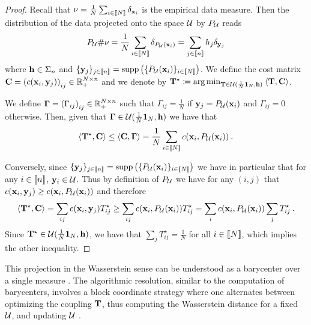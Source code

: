 \begin{proof}
Recall that $\nu = \frac{1}{N} \sum_{i \in {[\![N]\!]}} \delta_{{\mathbf{x}}_i}$ is the empirical data measure. Then the distribution of the data projected onto the space ${\mathcal{U}}$ by $P_{{\mathcal{U}}}$ reads
\begin{align}
    P_{{\mathcal{U}}} \# \nu = \frac{1}{N} \sum_{i \in {[\![N]\!]}} \delta_{P_{{\mathcal{U}}}({\mathbf{x}}_{i})} = \sum_{j \in {[\![n]\!]}} h_j \delta_{{\mathbf{y}}_{j}}
\end{align} 
where ${\mathbf{h}} \in \Sigma_n$ and $\{{\mathbf{y}}_j \}_{j \in {[\![n]\!]}} = \text{supp}\left( \{P_{{\mathcal{U}}}({\mathbf{x}}_{i}) \}_{i \in {[\![N]\!]}} \right)$. We define the cost matrix ${\mathbf{C}} = \left( c({\mathbf{x}}_i, {\mathbf{y}}_j) \right)_{ij} \in \mathbb{R}_+^{N \times n}$ and we denote by ${\mathbf{T}}^\star \coloneqq \operatorname*{arg\,min}_{{\mathbf{T}} \in {\mathcal{U}}(\frac{1}{N} \bm{1}_N, {\mathbf{h}})} \: \langle {\mathbf{T}}, {\mathbf{C}} \rangle$.

We define $\mathbf{\Gamma} = \left( \Gamma_{ij} \right)_{ij} \in \mathbb{R}_+^{N \times n}$ such that $\Gamma_{ij} = \frac{1}{N}$ if ${\mathbf{y}}_j = P_{{\mathcal{U}}}({\mathbf{x}}_i)$ and $\Gamma_{ij} = 0$ otherwise.
Then, given that $\mathbf{\Gamma} \in {\mathcal{U}}(\frac{1}{N} \bm{1}_N, {\mathbf{h}})$ we have that
\begin{align}
    \langle {\mathbf{T}}^\star, {\mathbf{C}} \rangle \leq \langle {\mathbf{C}}, \mathbf{\Gamma} \rangle = \frac{1}{N} \sum_{i \in {[\![N]\!]}} c(\mathbf{x}_i, P_{{\mathcal{U}}}(\mathbf{x}_i)) \:.
\end{align}

Conversely, since $\{{\mathbf{y}}_j \}_{j \in {[\![n]\!]}} = \text{supp}\left( \{P_{{\mathcal{U}}}({\mathbf{x}}_{i}) \}_{i \in {[\![N]\!]}} \right)$ we have in particular that for any $i \in {[\![n]\!]}$, ${\mathbf{y}}_i \in {\mathcal{U}}$. Thus by definition of $P_{{\mathcal{U}}}$ we have for any $(i,j)$ that $c({\mathbf{x}}_i, {\mathbf{y}}_j) \geq c({\mathbf{x}}_i, P_{{\mathcal{U}}}({\mathbf{x}}_i))$ and therefore
\begin{align}
    \langle {\mathbf{T}}^\star, {\mathbf{C}} \rangle = \sum_{ij} c({\mathbf{x}}_i, {\mathbf{y}}_j) T^\star_{ij} \geq \sum_{ij} c({\mathbf{x}}_i, P_{{\mathcal{U}}}({\mathbf{x}}_i)) T^\star_{ij} = \sum_{i} c({\mathbf{x}}_i, P_{{\mathcal{U}}}({\mathbf{x}}_i)) \sum_j T^\star_{ij} \:. 
\end{align}
Since ${\mathbf{T}}^\star \in {\mathcal{U}}(\frac{1}{N} \bm{1}_N, {\mathbf{h}})$, we have that $\sum_j T^\star_{ij} = \frac{1}{N}$ for all $i \in {[\![N]\!]}$, which implies the other inequality.

\end{proof}

This projection in the Wasserstein sense can be understood as a barycenter over a single measure \citep{agueh2011barycenters}. The algorithmic resolution, similar to the computation of barycenters, involves a block coordinate strategy where one alternates between optimizing the coupling ${\mathbf{T}}$, thus computing the Wasserstein distance for a fixed ${\mathcal{U}}$, and updating ${\mathcal{U}}$ \citep{cuturi2014fast}. 

